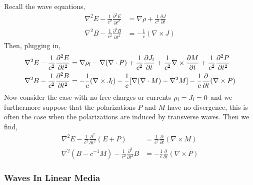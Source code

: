\documentclass[12pt]{extarticle}
\newcommand{\pderiv}[2]{\frac{\partial{#1}}{\partial{#2}}}
\newcommand{\npar}[3]{\frac{\partial^{#1}{#2}}{\partial{#3}^{#1}}}
\theoremstyle{definition}
\begin{document}
Recall the wave equations, 
\begin{align*}
\nabla^2 E - \frac{1}{c^2} \npar{2}{E}{t} & = \nabla \rho  + \frac{1}{c^2} \pderiv{J}{t}
\\
\nabla^2 B - \frac{1}{c^2} \npar{2}{B}{t} & = - \frac{1}{c} (\nabla \times J) 
\end{align*}
Then, plugging in,
\begin{align*}
\nabla^2 E - \frac{1}{c^2} \npar{2}{E}{t} & = \nabla \rho_{\free} - \nabla(\nabla \cdot P) + \frac{1}{c^2} \pderiv{J_{\free}}{t} + \frac{1}{c^2} \nabla \times \pderiv{M}{t} + \frac{1}{c^2} \npar{2}{P}{t}
\\
\nabla^2 B - \frac{1}{c^2} \npar{2}{B}{t} & = - \frac{1}{c} (\nabla \times J_{\free}) - \frac{1}{c} [ \nabla (\nabla \cdot M) - \nabla^2 M ] - \frac{1}{c} \pderiv{}{t} (\nabla \times P)
\end{align*}
Now consider the case with no free charges or currents $\rho_{\text{f}} = J_{\text{f}} = 0$ and we furthermore suppose that the polarizations $P$ and $M$ have no divergence, this is often the case when the polarizations are induced by transverse waves. Then we find,
\begin{align*}
\nabla^2 E - \frac{1}{c^2} \npar{2}{}{t} (E + P) & =  \frac{1}{c^2} \pderiv{}{t} (\nabla \times M)
\\
\nabla^2 (B - c^{-1} M) - \frac{1}{c^2} \npar{2}{}{t} B & = - \frac{1}{c} \pderiv{}{t} (\nabla \times P)
\end{align*}


\subsubsection{Waves In Linear Media}
\end{document}
